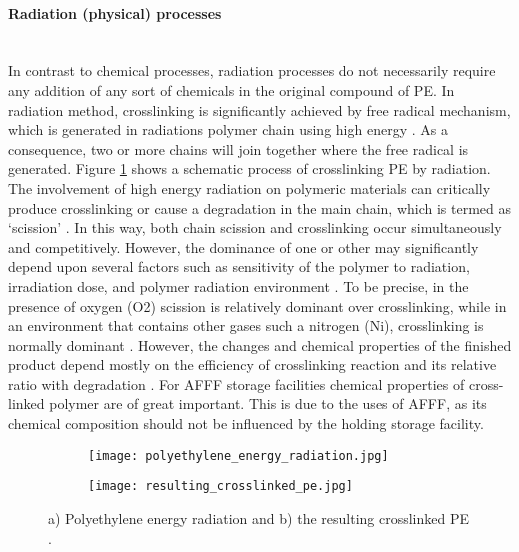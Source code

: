 \paragraph{Radiation (physical) processes} \hfill \\
In contrast to chemical processes, radiation processes do not necessarily require any addition of any sort of chemicals in the original compound of PE. In radiation method, crosslinking is significantly achieved by free radical mechanism, which is generated in radiations polymer chain using high energy \cite{meola2005cross}. As a consequence, two or more chains will join together where the free radical is generated. Figure \ref{ch3:figure:radiation} shows a schematic process of crosslinking PE by radiation. 
The involvement of high energy radiation on polymeric materials can critically produce crosslinking or cause a degradation in the main chain, which is termed as ‘scission’ \cite{meola2005cross}. In this way, both chain scission and crosslinking occur simultaneously and competitively. However, the dominance of one or other may significantly depend upon several factors such as sensitivity of the polymer to radiation, irradiation dose, and polymer radiation environment \cite{meola2005cross}. To be precise, in the presence of oxygen (O2) scission is relatively dominant over crosslinking, while in an environment that contains other gases such a nitrogen (Ni), crosslinking is normally dominant \cite{meola2005cross}. However, the changes and chemical properties of the finished product depend mostly on the efficiency of crosslinking reaction and its relative ratio with degradation \cite{meola2005cross}. For AFFF storage facilities chemical properties of cross-linked polymer are of great important. This is due to the uses of AFFF, as its chemical composition should not be influenced by the holding storage facility.

\begin{figure}[H]
\captionsetup[subfigure]{justification=raggedright}

\centering

\begin{subfigure}{.9\textwidth}
    \centering
    \texttt{[image: polyethylene\_energy\_radiation.jpg]}
    \caption{}
\end{subfigure}
\begin{subfigure}{.9\textwidth}
    \centering
    \texttt{[image: resulting\_crosslinked\_pe.jpg]}
    \caption{}
\end{subfigure}

\caption{a) Polyethylene energy radiation and b) the resulting crosslinked PE \cite{meola2005cross}.}
\label{ch3:figure:radiation}
\end{figure}


